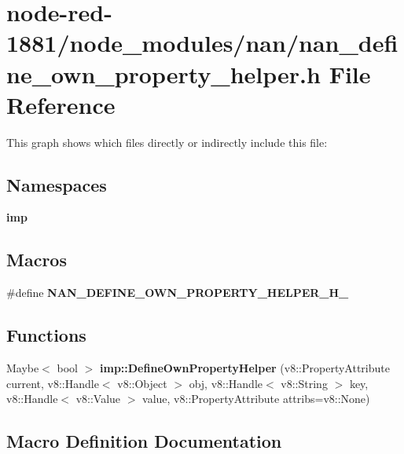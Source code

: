 \section{node-\/red-\/1881/node\+\_\+modules/nan/nan\+\_\+define\+\_\+own\+\_\+property\+\_\+helper.h File Reference}
\label{nan__define__own__property__helper_8h}
This graph shows which files directly or indirectly include this file\+:
\subsection*{Namespaces}
\begin{DoxyCompactItemize}
\item 
 \textbf{ imp}
\end{DoxyCompactItemize}
\subsection*{Macros}
\begin{DoxyCompactItemize}
\item 
\#define \textbf{ N\+A\+N\+\_\+\+D\+E\+F\+I\+N\+E\+\_\+\+O\+W\+N\+\_\+\+P\+R\+O\+P\+E\+R\+T\+Y\+\_\+\+H\+E\+L\+P\+E\+R\+\_\+\+H\+\_\+}
\end{DoxyCompactItemize}
\subsection*{Functions}
\begin{DoxyCompactItemize}
\item 
Maybe$<$ bool $>$ \textbf{ imp\+::\+Define\+Own\+Property\+Helper} (v8\+::\+Property\+Attribute current, v8\+::\+Handle$<$ v8\+::\+Object $>$ obj, v8\+::\+Handle$<$ v8\+::\+String $>$ key, v8\+::\+Handle$<$ v8\+::\+Value $>$ value, v8\+::\+Property\+Attribute attribs=v8\+::\+None)
\end{DoxyCompactItemize}


\subsection{Macro Definition Documentation}
\mbox{\label{nan_8h_ac31ad61044299acbd8b92d341f288885}} 
